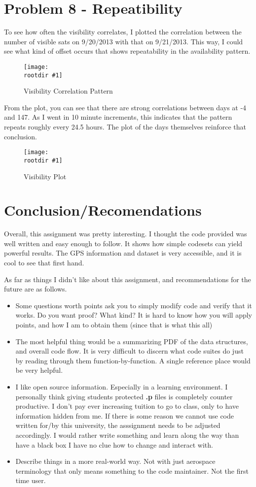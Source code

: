 \documentclass[12pt,a4paper,oneside]{article}
\newcommand{\rootdir}{./Figures/}
\newcommand{\figH}[3]{
			\begin{figure}[H]
				\centering
				\texttt{[image: \\rootdir \#1]}
				\caption{#2}
				\label{#3}
			\end{figure}
			}
\begin{document}
\section{Problem 8 - Repeatibility}
To see how often the visibility correlates, I plotted the correlation between the number of visible sats on 9/20/2013 with that on 9/21/2013. This way, I could see what kind of offset occurs that shows repeatability in the availability pattern. 
\figH{corr.eps}{Visibility Correlation Pattern}{fig:corr}
From the plot, you can see that there are strong correlations between days at -4 and 147. As I went in 10 minute increments, this indicates that the pattern repeats roughly every 24.5 hours. The plot of the days themselves reinforce that conclusion. 

\figH{corr2.eps}{Visibility Plot}{fig:corr2}

\section{Conclusion/Recomendations}
Overall, this assignment was pretty interesting. I thought the code provided was well written and easy enough to follow. It shows how simple codesets can yield powerful results. The GPS information and dataset is very accessible, and it is cool to see that first hand. 

As far as things I didn't like about this assignment, and recommendations for the future are as follows. 

\begin{itemize}
	\renewcommand{\labelitemi}{$\bullet$}
	\item Some questions worth points ask you to simply modify code and verify that it works. Do you want proof? What kind? It is hard to know how you will apply points, and how I am to obtain them (since that is what this all)
	\item The most helpful thing would be a summarizing PDF of the data structures, and overall code flow. It is very difficult to discern what code suites do just by reading through them function-by-function. A single reference place would be very helpful. 
	\item I like open source information. Especially in a learning environment. I personally think giving students protected \textbf{.p} files is completely counter productive. I don't pay ever increasing tuition to go to class, only to have information hidden from me. If there is some reason we cannot use code written for/by this university, the asssignment needs to be adjusted accordingly. I would rather write something and learn along the way than have a black box I have no clue how to change and interact with. 
	\item Describe things in a more real-world way. Not with just aerospace terminology that only means something to the code maintainer. Not the first time user. 
\end{itemize}
\end{document}
